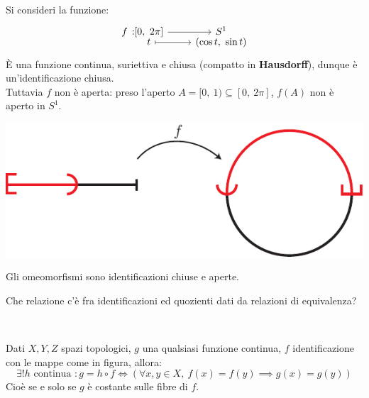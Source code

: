 \begin{example}
	Si consideri la funzione:
	\begin{equation*}
		\funztot f {[0, \ 2\pi]} {S^1} t {(\cos t, \ \sin t)}
	\end{equation*}
	È una funzione continua, suriettiva e chiusa (compatto in \textbf{Hausdorff}), dunque è un'identificazione chiusa. \\
	Tuttavia $f$ non è aperta: preso l'aperto $A=[0, \ 1)\subseteq [0, \ 2\pi]$, $f(A)$ non è aperto in $S^1$.
		\begin{center}
			\includegraphics[trim=0cm 0cm 0cm 0cm,clip,scale=0.9]{images/half_circle-eps-converted-to.pdf}
		\end{center}
	\vspace{-6mm}
\end{example}
\begin{observe}
	Gli omeomorfismi sono identificazioni chiuse e aperte.
\end{observe}
Che relazione c'è fra identificazioni ed quozienti dati da relazioni di equivalenza?
\begin{theorema}~{}\\
\begin{minipage}[t]{0.83\textwidth}
		Dati $X,Y,Z$ spazi topologici, $g$ una qualsiasi funzione continua, $f$ identificazione con le mappe come in figura, allora:
		\begin{equation*}
			\exists! h \text{ continua } \colon g=h\circ f \iff \left( \forall x,y\in X, \ f(x)=f(y)\implies g(x)=g(y)  \right)
		\end{equation*}
	\vspace{-2mm}
		Cioè se e solo se $g$ è costante sulle fibre di $f$.
\end{minipage}
	\begin{minipage}[t]{0.13\textwidth}\vspace{-10pt}
	\end{minipage}
\end{theorema}
